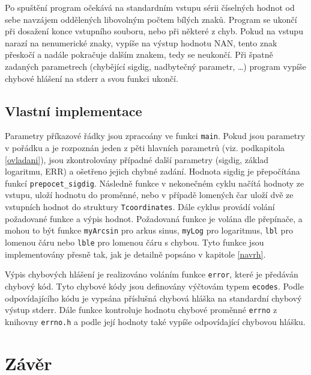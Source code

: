 \documentclass[12pt,a4paper,titlepage,final]{article}
\begin{document}
Po spuštění program očekává na standardním vstupu sérii číselných hodnot
od sebe navzájem oddělených libovolným počtem bílých znaků. Program se ukončí
při dosažení konce vstupního souboru, nebo při některé z chyb. Pokud na vstupu
narazí na nenumerické znaky, vypíše na výstup hodnotu NAN, tento znak přeskočí
a nadále pokračuje dalším znakem, tedy se neukončí. Při špatně zadaných
parametrech (chybějící sigdig, nadbytečný parametr, \dots) program vypíše
chybové hlášení na stderr a svou funkci ukončí.

\subsection{Vlastní implementace}

Parametry příkazové řádky jsou zpracoány ve funkci \texttt{main}. Pokud jsou
parametry v pořádku a je rozpoznán jeden z pěti hlavních parametrů (viz. 
podkapitola \ref{ovladani}), jsou zkontrolovány případné další parametry
(sigdig, základ logaritmu, ERR) a ošetřeno jejich chybné zadání. Hodnota
sigdig je přepočítána funkcí \texttt{prepocet\_sigdig}. Následně
funkce v nekonečném cyklu načítá hodnoty ze vstupu, uloží hodnotu do proměnné,
nebo v případě lomených čar uloží dvě ze vstupních hodnot do struktury
\texttt{Tcoordinates}. Dále cyklus provádí volání požadované funkce a výpis
hodnot. Požadovaná funkce je volána dle přepínače, a mohou to být funkce
\texttt{myArcsin} pro arkus sinus, \texttt{myLog} pro logaritmus,
\texttt{lbl} pro lomenou čáru nebo \texttt{lble} pro lomenou čáru s chybou.
Tyto funkce jsou implementovány přesně tak, jak je detailně popsáno v
kapitole \ref{navrh}.

Výpis chybových hlášení je realizováno voláním funkce \texttt{error}, které
je předáván chybový kód. Tyto chybové kódy jsou definovány výčtovám typem
\texttt{ecodes}. Podle odpovídajícího kódu je vypsána příslušná chybová hláška
na standardní chybový výstup stderr. Dále funkce kontroluje hodnotu chybové
proměnné \texttt{errno} z knihovny \texttt{errno.h} a podle její hodnoty také
vypíše odpovídající chybovou hlášku.

\section{Závěr} \label{zaver}
\end{document}
